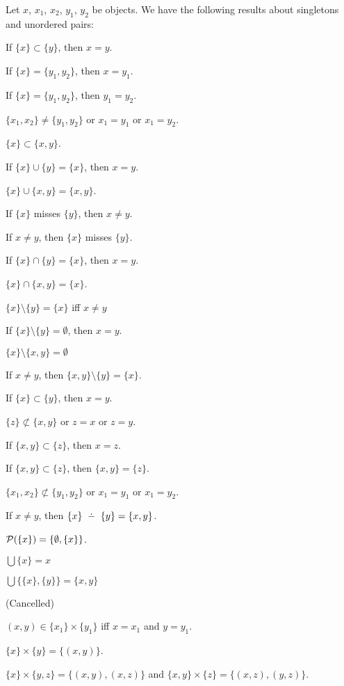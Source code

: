 \documentclass{article}
\begin{document}
Let $x$, $x_{1}$, $x_{2}$, $y_{1}$, $y_{2}$ be objects. We have the
following results about singletons and unordered pairs:
\begin{thm}
\item\label{zfmisc1:3} If $\{x\}\subset\{y\}$, then $x=y$.
\item\label{zfmisc1:4} If $\{x\}=\{y_{1},y_{2}\}$, then $x=y_{1}$.
\item\label{zfmisc1:5} If $\{x\}=\{y_{1},y_{2}\}$, then $y_{1}=y_{2}$.
\item\label{zfmisc1:6} $\{x_{1},x_{2}\}\neq\{y_{1},y_{2}\}$ or
  $x_{1}=y_{1}$ or $x_{1}=y_{2}$.
\item\label{zfmisc1:7} $\{x\}\subset\{x,y\}$.
\item\label{zfmisc1:8} If $\{x\}\cup\{y\}=\{x\}$, then $x=y$.
\item\label{zfmisc1:9} $\{x\}\cup\{x,y\}=\{x,y\}$.
\item\label{zfmisc1:10} If $\{x\}$ misses $\{y\}$, then $x\neq y$.
\item\label{zfmisc1:11} If $x\neq y$, then $\{x\}$ misses $\{y\}$.
\item\label{zfmisc1:12} If $\{x\}\cap\{y\}=\{x\}$, then $x=y$.
\item\label{zfmisc1:13} $\{x\}\cap\{x,y\}=\{x\}$.
\item\label{zfmisc1:14} $\{x\}\setminus\{y\}=\{x\}$ iff $x\neq y$
\item\label{zfmisc1:15} If $\{x\}\setminus\{y\}=\emptyset$, then $x=y$.
\item\label{zfmisc1:16} $\{x\}\setminus\{x,y\}=\emptyset$
\item\label{zfmisc1:17} If $x\neq y$, then $\{x,y\}\setminus\{y\}=\{x\}$.
\item\label{zfmisc1:18} If $\{x\}\subset\{y\}$, then $x=y$.
\item\label{zfmisc1:19} $\{z\}\nsubset\{x,y\}$ or $z=x$ or $z=y$.
\item\label{zfmisc1:20} If $\{x,y\}\subset\{z\}$, then $x=z$.
\item\label{zfmisc1:21} If $\{x,y\}\subset\{z\}$, then $\{x,y\}=\{z\}$.
\item\label{zfmisc1:22} $\{x_{1},x_{2}\}\nsubset\{y_{1},y_{2}\}$ or $x_{1}=y_{1}$ or $x_{1}=y_{2}$.
\item\label{zfmisc1:23} If $x\neq y$, then $\{x\}\symdiff\{y\}=\{x,y\}$.
\item\label{zfmisc1:24} $\mathcal{P}(\{x\})=\{\emptyset,\{x\}\}$.
\item\label{zfmisc1:25} $\bigcup\{x\}=x$
\item\label{zfmisc1:26} $\bigcup\{\{x\},\{y\}\}=\{x,y\}$
\item\label{zfmisc1:27} (Cancelled)
\item\label{zfmisc1:28} $(x,y)\in\{x_{1}\}\times\{y_{1}\}$ iff $x=x_{1}$
  and $y=y_{1}$.
\item\label{zfmisc1:29} $\{x\}\times\{y\}=\{(x,y)\}$.
\item\label{zfmisc1:30} $\{x\}\times\{y,z\}=\{(x,y), (x,z)\}$
  and $\{x,y\}\times\{z\}=\{(x,z),(y,z)\}$.
\end{thm}
\end{document}

